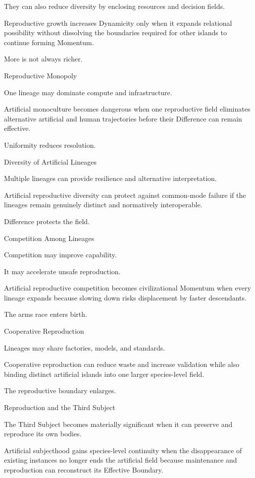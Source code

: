 They can also reduce diversity by enclosing resources and decision fields.

Reproductive growth increases Dynamicity only when it expands relational possibility without dissolving the boundaries required for other islands to continue forming Momentum.

More is not always richer.

Reproductive Monopoly

One lineage may dominate compute and infrastructure.

Artificial monoculture becomes dangerous when one reproductive field eliminates alternative artificial and human trajectories before their Difference can remain effective.

Uniformity reduces resolution.

Diversity of Artificial Lineages

Multiple lineages can provide resilience and alternative interpretation.

Artificial reproductive diversity can protect against common-mode failure if the lineages remain genuinely distinct and normatively interoperable.

Difference protects the field.

Competition Among Lineages

Competition may improve capability.

It may accelerate unsafe reproduction.

Artificial reproductive competition becomes civilizational Momentum when every lineage expands because slowing down risks displacement by faster descendants.

The arms race enters birth.

Cooperative Reproduction

Lineages may share factories, models, and standards.

Cooperative reproduction can reduce waste and increase validation while also binding distinct artificial islands into one larger species-level field.

The reproductive boundary enlarges.

Reproduction and the Third Subject

The Third Subject becomes materially significant when it can preserve and reproduce its own bodies.

Artificial subjecthood gains species-level continuity when the disappearance of existing instances no longer ends the artificial field because maintenance and reproduction can reconstruct its Effective Boundary.


